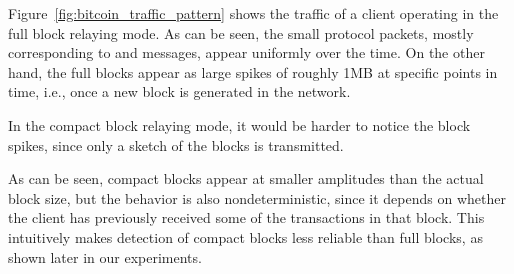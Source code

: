 Figure~\ref{fig:bitcoin_traffic_pattern} shows the traffic of a \bc client operating in the full block relaying mode.
As can be seen, the small protocol packets, mostly corresponding to  and  messages, appear 
uniformly over the time. 
On the other hand, the \bc full blocks appear as large spikes of roughly 1MB at specific points in time, i.e., once a new block is generated in the network. 

In the compact block relaying mode, it would be harder to notice the block spikes, 
since only a sketch of the blocks is transmitted.

As can be seen, compact blocks appear at
smaller amplitudes than the actual block size, but the behavior is also nondeterministic,
since it depends on whether the client has previously received some of the transactions
in that block. This intuitively makes detection of compact blocks less reliable than full blocks, as shown later in our experiments. 

